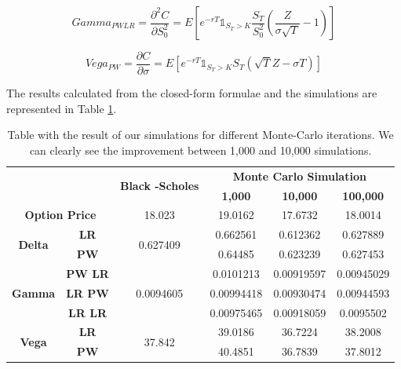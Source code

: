 \documentclass[11pt,a4paper,fleqn]{article}
\begin{document}
$$Gamma_{PWLR} = \frac{\partial^2 C}{\partial  S_0^2 }=E[e^{-rT}\mathds{1}_{S_T>K}\frac{S_T}{S_0^2}\left(\frac{Z}{\sigma\sqrt{T}}-1\right)]$$

$$Vega_{PW} = \frac{\partial C}{\partial \sigma}=E[e^{-rT}\mathds{1}_{S_T>K}S_T(\sqrt{T}Z-\sigma T)]$$

The results calculated from the closed-form formulae and the simulations are represented in Table \ref{tab:euroresults}.


\begin{table}[h!]
\centering
\begin{tabular}{|c|c|c|c|c|c|}
\hline
\multicolumn{2}{|c|}{\multirow{2}{*}{}}          & \multirow{2}{*}{\textbf{Black -Scholes}} & \multicolumn{3}{c|}{\textbf{Monte Carlo Simulation}} \\ \cline{4-6}
\multicolumn{2}{|c|}{}                           &                                          & \textbf{1,000}  & \textbf{10,000} & \textbf{100,000} \\ \hline
\multicolumn{2}{|c|}{\textbf{Option Price}}      & 18.023                                   & 19.0162         & 17.6732         & 18.0014          \\ \hline
\multirow{2}{*}{\textbf{Delta}} & \textbf{LR}    & \multirow{2}{*}{0.627409}                & 0.662561        & 0.612362        & 0.627889         \\ \cline{2-2} \cline{4-6}
                                & \textbf{PW}    &                                          & 0.64485         & 0.623239        & 0.627453         \\ \hline
\multirow{3}{*}{\textbf{Gamma}} & \textbf{PW LR} & \multirow{3}{*}{0.0094605}               & 0.0101213       & 0.00919597      & 0.00945029       \\ \cline{2-2} \cline{4-6}
                                & \textbf{LR PW} &                                          & 0.00994418      & 0.00930474      & 0.00944593       \\ \cline{2-2} \cline{4-6}
                                & \textbf{LR LR} &                                          & 0.00975465      & 0.00918059      & 0.0095502        \\ \hline
\multirow{2}{*}{\textbf{Vega}}  & \textbf{LR}    & \multirow{2}{*}{37.842}                  & 39.0186         & 36.7224         & 38.2008          \\ \cline{2-2} \cline{4-6}
                                & \textbf{PW}    &                                          & 40.4851         & 36.7839         & 37.8012          \\ \hline
\end{tabular}
\caption{\label{tab:euroresults}Table with the result of our simulations for different Monte-Carlo iterations. We can clearly see the improvement between 1,000 and 10,000 simulations.}
\end{table}
\end{document}
